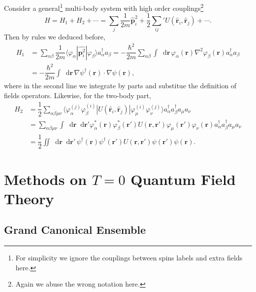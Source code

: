 \documentclass[b5paper,10pt,UTF8]{book}
\newcommand*\dd{\mathop{}\!\mathrm{d}}
\numberwithin{equation}{section}
\begin{document}
		\begin{Example}
			Consider a general\footnote{For simplicity we ignore the couplings between spins labels and extra fields here.} multi-body system with high order couplings\footnote{Again we abuse the wrong notation here.}
			$$H=H_1+H_2+\cdots=\sum_j\dfrac{1}{2m}\hat{\bm p}_i^2+\dfrac{1}{2}{\sum_{ij}}'U(\hat{\bm{r}}_i,\hat{\bm{r}}_j)+\cdots.$$
			Then by rules we deduced before,
			\begin{align*}
				H_1&=\sum_{\alpha\beta}\dfrac{1}{2m}\langle\varphi_\alpha|\hat{\bm{p}^2_i}|\varphi_\beta\rangle a_\alpha^\dagger a_\beta=-\dfrac{\hbar^2}{2m}\sum_{\alpha\beta}\int\dd\bm{r}\,\varphi_\alpha(\bm{r})\nabla^2\varphi_\beta(\bm{r})a_\alpha^\dagger a_\beta\\
				&=-\dfrac{\hbar^2}{2m}\int\dd\bm{r}\,\nabla\psi^\dagger(\bm{r})\cdot\nabla\psi(\bm{r}),
			\end{align*}
			where in the second line we integrate by parts and substitue the definition of fields operators. Likewise, for the two-body part,
			\begin{align*}
				H_2&=\dfrac{1}{2}\sum_{\alpha\beta\mu\nu}\langle\varphi_\alpha^{(j)}\varphi_\beta^{(i)}|U(\hat{\bm r}_i,\hat{\bm r}_j)|\varphi_\mu^{(i)}\varphi^{(j)}_\nu\rangle a_\alpha^\dagger a_\beta^\dagger a_\mu a_\nu\\
				&=\sum_{\alpha\beta\mu\nu}\int\dd\bm{r}\dd\bm{r'}\varphi_\alpha^*(\bm{r})\varphi_\beta^*(\bm{r'})U(\bm{r},\bm{r'})\varphi_\mu(\bm{r'})\varphi_\nu(\bm{r})a_\alpha^\dagger a_\beta^\dagger a_\mu a_\nu\\
				&=\dfrac{1}{2}\iint\dd\bm{r}\dd\bm{r'}\,\psi^\dagger(\bm{r})\psi^\dagger(\bm{r'})U(\bm{r},\bm{r'})\psi(\bm{r'})\psi(\bm{r}).
			\end{align*}
		\end{Example}

\chapter{Methods on $T=0$ Quantum Field Theory}
	\section{Grand Canonical Ensemble}
\end{document}
